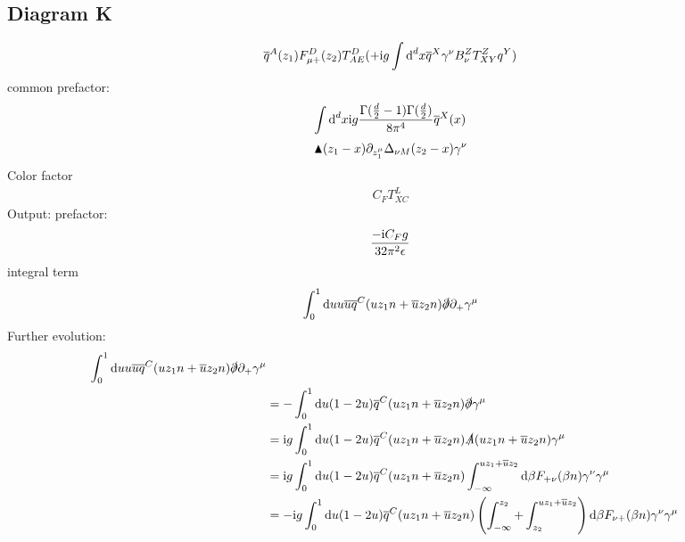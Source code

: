 \subsection{Diagram K}
\begin{align}
\overline q^A(z_1) F_{\mu +}^D(z_2) T^D_{AE}   (+\text{i} g \int \text{d} ^d x \overline q^X \gamma^\nu B_\nu^Z T^Z_{XY} q^Y)
\end{align}
common prefactor:
\begin{align}
\int \text{d} ^d x \text{i} g \frac{\Gamma(\frac{d}{2}-1)\Gamma(\frac{d}{2})}{8\pi^4}\overline q^X(x)
\end{align}
\begin{align}
\blacktriangle(z_1-x)\partial_{z_1^\mu}\Delta_{\nu M}(z_2-x)\gamma^\nu
\end{align}
Color factor
\begin{align}
	C_F T^{L}_{XC}
\end{align}
Output:
prefactor:
\begin{align}
\frac{- \text{i}  C_F g}{32 \pi^2 \epsilon}
\end{align}
integral term
\begin{align}
\int_0^1 \text{d} u u \overline u \overline q^C(uz_1n+\overline u z_2n)\slashed \partial \partial_+ \gamma^\mu 
\end{align}
Further evolution:
\begin{align}
\int_0^1 \text{d} u u \overline u \overline q^C(uz_1n+\overline u z_2n)\slashed \partial \partial_+ \gamma^\mu
\\
&=
- \int_0^1 \text{d} u (1-2u) \overline q^C(uz_1n+\overline u z_2n)\slashed \partial  \gamma^\mu
\\
&=
\text{i} g  \int_0^1 \text{d} u (1-2u) \overline q^C(uz_1n+\overline u z_2n)\slashed A(uz_1n+\overline u z_2n)  \gamma^\mu
\\
&=
\text{i} g  \int_0^1 \text{d} u (1-2u) \overline q^C(uz_1n+\overline u z_2n)\int_{-\infty}^{uz_1+\overline u z_2} \text{d} \beta F_{+\nu}(\beta n) \gamma^\nu \gamma^\mu
\\
&=
- \text{i} g  \int_0^1 \text{d} u (1-2u) \overline q^C(uz_1n+\overline u z_2n)\left( \int_{-\infty}^{z_2} + \int_{z_2}^{uz_1+\overline u z_2} \right) \text{d} \beta F_{\nu +}(\beta n) \gamma^\nu \gamma^\mu
\end{align}

